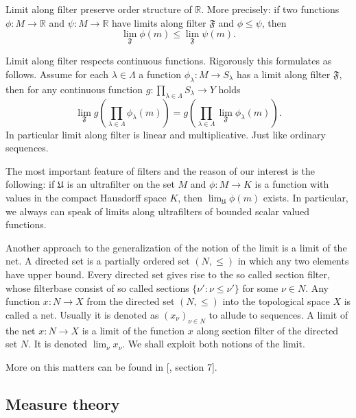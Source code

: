 Limit along filter preserve order structure of $\mathbb{R}$. More precisely: if two functions $\phi:M\to\mathbb{R}$ and $\psi:M\to\mathbb{R}$ have limits along filter $\mathfrak{F}$ and $\phi\leq\psi$, then 
$$
\lim_{\mathfrak{F}}\phi(m)\leq\lim_{\mathfrak{F}}\psi(m).
$$

Limit along filter respects continuous functions. Rigorously this formulates as follows. Assume for each $\lambda\in\Lambda$ a function $\phi_\lambda:M\to S_\lambda$ has a limit along filter $\mathfrak{F}$, then for any continuous function $g:\prod_{\lambda\in\Lambda}S_\lambda\to Y$ holds
$$
\lim_{\mathfrak{F}}g\left(\prod_{\lambda\in\Lambda}\phi_\lambda(m)\right)=g\left(\prod_{\lambda\in\Lambda}\lim_{\mathfrak{F}}\phi_\lambda(m)\right).
$$
In particular limit along filter is linear and multiplicative. Just like ordinary sequences.

The most important feature of filters and the reason of our interest is the following: if $\mathfrak{U}$ is an ultrafilter on the set $M$ and $\phi:M\to K$ is a function with values in the compact Hausdorff space $K$, then $\lim_{\mathfrak{U}}\phi(m)$ exists. In particular, we always can speak of limits along ultrafilters of bounded scalar valued functions.

Another approach to the generalization of the notion of the limit is a limit of the net. A directed set is a partially ordered set $(N,\leq)$ in which any two elements have upper bound. Every directed set gives rise to the so called section filter, whose filterbase consist of so called sections $\{\nu':\nu\leq\nu'\}$ for some $\nu\in N$.
Any function $x:N\to X$ from the directed set $(N,\leq)$ into the topological space $X$ is called a net. Usually it is denoted as $(x_\nu)_{\nu\in N}$ to allude to sequences. A limit of the net $x:N\to X$ is a limit of the function $x$ along section filter of the directed set $N$. It is denoted $\lim_\nu x_\nu$. We shall exploit both notions of the limit.

More on this matters can be found in [\cite{BourbElemMathGenTopLivIII}, section 7].



\subsection{Measure theory}
\label{SubSectionMeasureTheory}


